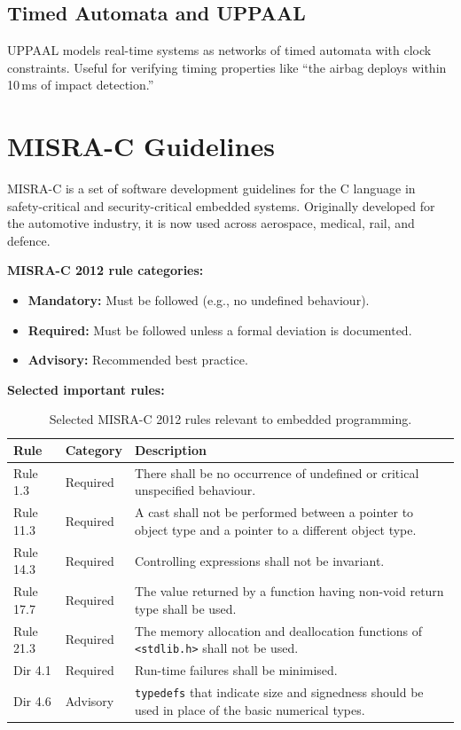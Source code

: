 \subsection{Timed Automata and UPPAAL}

UPPAAL models real-time systems as networks of timed automata with clock constraints. Useful for verifying timing properties like ``the airbag deploys within 10\,ms of impact detection.''

\section{MISRA-C Guidelines}
\label{sec:ana:misra}

\begin{definition}[MISRA-C]
MISRA-C\cite{misrac2012} is a set of software development guidelines for the C language in safety-critical and security-critical embedded systems. Originally developed for the automotive industry, it is now used across aerospace, medical, rail, and defence.
\end{definition}

\textbf{MISRA-C 2012 rule categories:}
\begin{itemize}[nosep]
  \item \textbf{Mandatory:} Must be followed (e.g., no undefined behaviour).
  \item \textbf{Required:} Must be followed unless a formal deviation is documented.
  \item \textbf{Advisory:} Recommended best practice.
\end{itemize}

\textbf{Selected important rules:}

\begin{table}[H]
\centering
\caption{Selected MISRA-C 2012 rules relevant to embedded programming.}
\label{tab:ana:misra}
\begin{tabularx}{\linewidth}{@{}lp{2.2cm}X@{}}
\toprule
\textbf{Rule} & \textbf{Category} & \textbf{Description} \\
\midrule
Rule 1.3 & Required & There shall be no occurrence of undefined or critical unspecified behaviour. \\
Rule 11.3 & Required & A cast shall not be performed between a pointer to object type and a pointer to a different object type. \\
Rule 14.3 & Required & Controlling expressions shall not be invariant. \\
Rule 17.7 & Required & The value returned by a function having non-void return type shall be used. \\
Rule 21.3 & Required & The memory allocation and deallocation functions of \texttt{<stdlib.h>} shall not be used. \\
Dir 4.1 & Required & Run-time failures shall be minimised. \\
Dir 4.6 & Advisory & \texttt{typedefs} that indicate size and signedness should be used in place of the basic numerical types. \\
\bottomrule
\end{tabularx}
\end{table}

